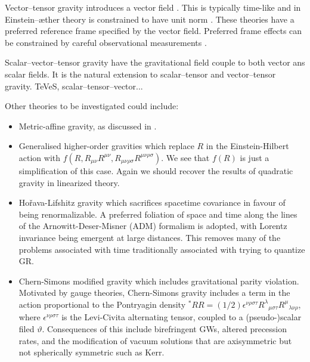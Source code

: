Vector--tensor gravity introduces a vector field \citep{Will1972,Nordtvedt1972}. This is typically time-like and in Einstein--\ae{}ther theory is constrained to have unit norm \citep{Jacobson2001,Jacobson2008}. These theories have a preferred reference frame specified by the vector field. Preferred frame effects can be constrained by careful observational measurements \citep[chapter 8]{Will1993}.


Scalar--vector--tensor gravity have the gravitational field couple to both vector ans scalar fields. It is the natural extension to scalar--tensor and vector--tensor gravity. TeVeS, scalar--tensor--vector...

Other theories to be investigated could include:
\begin{itemize}
\item Metric-affine gravity\cite{Sotiriou2007, Sotiriou2007b}, as discussed in .
\item{} Generalised higher-order gravities which replace $R$ in the Einstein-Hilbert action with $f(R, R_{\mu\nu}R^{\mu\nu}, R_{\mu\nu\rho\sigma}R^{\mu\nu\rho\sigma})$\cite{Farhoudi2006, Madsen1989}. We see that $f(R)$ is just a simplification of this case. Again we should recover the results of quadratic gravity in linearized theory\cite{Pechlaner1966, Stelle1978, Schmidt1986, Teyssandier1990, Capozziello2009b}.
\item{} Ho\v{r}ava-Lifshitz gravity\cite{Horava2009, Blas2010a, Sotiriou2009c} which sacrifices spacetime covariance in favour of being renormalizable. A preferred foliation of space and time along the lines of the Arnowitt-Deser-Misner (ADM) formalism is adopted\cite{Arnowitt1962a}, with Lorentz invariance being emergent at large distances. This removes many of the problems associated with time traditionally associated with trying to quantize GR.
\item{} Chern-Simons modified gravity\cite{Alexander2009a} which includes gravitational parity violation. Motivated by gauge theories, Chern-Simons gravity includes a term in the action proportional to the Pontryagin density ${^\ast R} R = (1/2)\epsilon^{\nu\rho\sigma\tau}{R^\lambda}_{\mu\sigma\tau}{R^\mu}_{\lambda\nu\rho}$, where $\epsilon^{\nu\rho\sigma\tau}$ is the Levi-Civita alternating tensor, coupled to a (pseudo-)scalar filed $\vartheta$. Consequences of this include birefringent GWs, altered precession rates, and the modification of vacuum solutions that are axisymmetric but not spherically symmetric such as Kerr.
\end{itemize}

